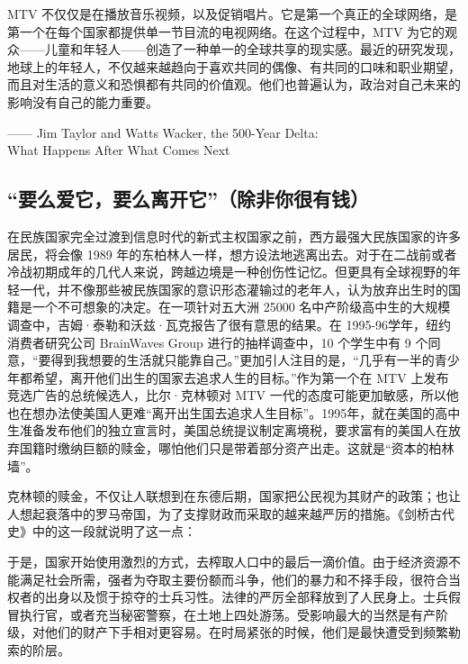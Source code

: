 \begin{tcolorbox}
MTV 不仅仅是在播放音乐视频，以及促销唱片。它是第一个真正的全球网络，是第一个在每个国家都提供单一节目流的电视网络。在这个过程中，MTV 为它的观众——儿童和年轻人——创造了一种单一的全球共享的现实感。最近的研究发现，地球上的年轻人，不仅越来越趋向于喜欢共同的偶像、有共同的口味和职业期望，而且对生活的意义和恐惧都有共同的价值观。他们也普遍认为，政治对自己未来的影响没有自己的能力重要。
\begin{flushright}
—— Jim Taylor and Watts Wacker, the 500-Year Delta: \\ What Happens After What Comes Next  
\end{flushright}
\end{tcolorbox}

\subsection{“要么爱它，要么离开它”（除非你很有钱）}
在民族国家完全过渡到信息时代的新式主权国家之前，西方最强大民族国家的许多居民，将会像 1989 年的东柏林人一样，想方设法地逃离出去。对于在二战前或者冷战初期成年的几代人来说，跨越边境是一种创伤性记忆。但更具有全球视野的年轻一代，并不像那些被民族国家的意识形态灌输过的老年人，认为放弃出生时的国籍是一个不可想象的决定。在一项针对五大洲 25000 名中产阶级高中生的大规模调查中，吉姆·泰勒和沃兹·瓦克报告了很有意思的结果。在 1995-96学年，纽约消费者研究公司 BrainWaves Group 进行的抽样调查中，10 个学生中有 9 个同意，“要得到我想要的生活就只能靠自己。”更加引人注目的是，“几乎有一半的青少年都希望，离开他们出生的国家去追求人生的目标。”作为第一个在 MTV 上发布竞选广告的总统候选人，比尔·克林顿对 MTV 一代的态度可能更加敏感，所以他也在想办法使美国人更难“离开出生国去追求人生目标”。1995年，就在美国的高中生准备发布他们的独立宣言时，美国总统提议制定离境税，要求富有的美国人在放弃国籍时缴纳巨额的赎金，哪怕他们只是带着部分资产出走。这就是“资本的柏林墙”。

克林顿的赎金，不仅让人联想到在东德后期，国家把公民视为其财产的政策；也让人想起衰落中的罗马帝国，为了支撑财政而采取的越来越严厉的措施。《剑桥古代史》中的这一段就说明了这一点：


\begin{tcolorbox}
于是，国家开始使用激烈的方式，去榨取人口中的最后一滴价值。由于经济资源不能满足社会所需，强者为夺取主要份额而斗争，他们的暴力和不择手段，很符合当权者的出身以及惯于掠夺的士兵习性。法律的严厉全部释放到了人民身上。士兵假冒执行官，或者充当秘密警察，在土地上四处游荡。受影响最大的当然是有产阶级，对他们的财产下手相对更容易。在时局紧张的时候，他们是最快遭受到频繁勒索的阶层。
\end{tcolorbox}

